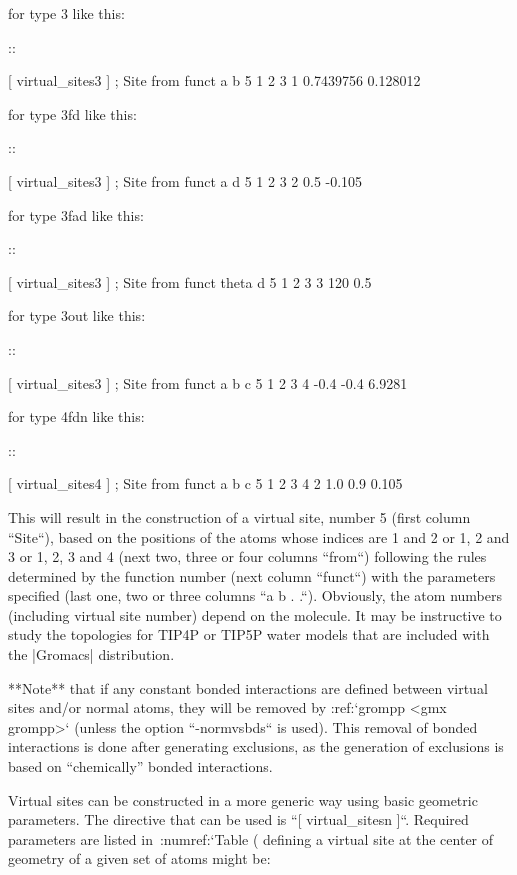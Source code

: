 for type 3 like this:

::

    [ virtual_sites3 ]
    ; Site  from               funct   a          b
    5       1     2     3      1       0.7439756  0.128012

for type 3fd like this:

::

    [ virtual_sites3 ]
    ; Site  from               funct   a          d
    5       1     2     3      2       0.5        -0.105

for type 3fad like this:

::

    [ virtual_sites3 ]
    ; Site  from               funct   theta      d
    5       1     2     3      3       120        0.5

for type 3out like this:

::

    [ virtual_sites3 ]
    ; Site  from               funct   a          b          c
    5       1     2     3      4       -0.4       -0.4       6.9281

for type 4fdn like this:

::

    [ virtual_sites4 ]
    ; Site  from                      funct   a          b          c
    5       1     2     3     4       2       1.0        0.9       0.105

This will result in the construction of a virtual site, number 5 (first
column ``Site``), based on the positions of the atoms
whose indices are 1 and 2 or 1, 2 and 3 or 1, 2, 3 and 4 (next two,
three or four columns ``from``) following the rules
determined by the function number (next column ``funct``)
with the parameters specified (last one, two or three columns
``a b . .``). Obviously, the atom numbers (including
virtual site number) depend on the molecule. It may be instructive to
study the topologies for TIP4P or TIP5P water models that are included
with the |Gromacs| distribution.

**Note** that if any constant bonded interactions are defined between
virtual sites and/or normal atoms, they will be removed by
:ref:`grompp <gmx grompp>` (unless the option ``-normvsbds`` is used). This
removal of bonded interactions is done after generating exclusions, as
the generation of exclusions is based on “chemically” bonded
interactions.

Virtual sites can be constructed in a more generic way using basic
geometric parameters. The directive that can be used is ``[ virtual_sitesn ]``. Required
parameters are listed in :numref:`Table (%
defining a virtual site at the center of geometry of a given set of
atoms might be:


